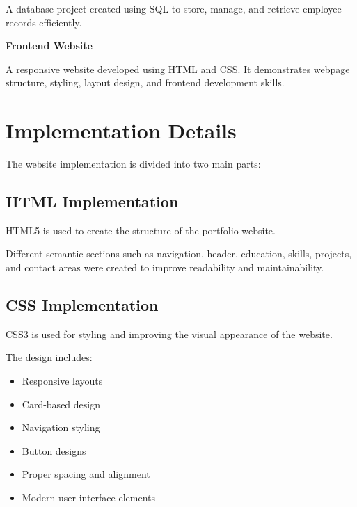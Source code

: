 \documentclass[12pt,a4paper]{article}
\begin{document}
A database project created using SQL to store, manage, and retrieve employee records efficiently.



\textbf{Frontend Website}

A responsive website developed using HTML and CSS. It demonstrates webpage structure, styling, layout design, and frontend development skills.





\section{Implementation Details}


The website implementation is divided into two main parts:



\subsection{HTML Implementation}


HTML5 is used to create the structure of the portfolio website.

Different semantic sections such as navigation, header, education, skills, projects, and contact areas were created to improve readability and maintainability.



\subsection{CSS Implementation}


CSS3 is used for styling and improving the visual appearance of the website.

The design includes:


\begin{itemize}

\item Responsive layouts

\item Card-based design

\item Navigation styling

\item Button designs

\item Proper spacing and alignment

\item Modern user interface elements

\end{itemize}
\end{document}
